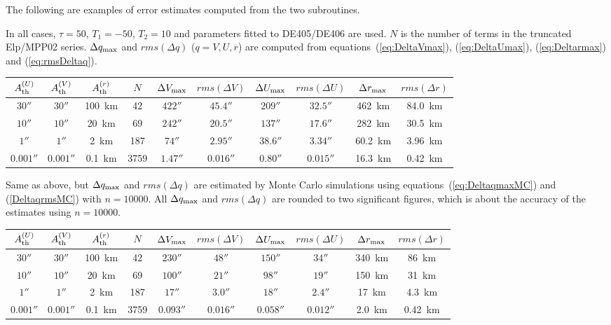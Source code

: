 \documentclass[12pt]{article}
\begin{document}
The following are examples of error estimates computed from the two subroutines.

\vskip 0.5cm
In all cases, $\tau=50$, $T_1=-50$, $T_2=10$ and parameters fitted to DE405/DE406 are 
used. $N$ is the 
number of terms in the truncated Elp/MPP02 series. $\Delta q_{\rm max}$ 
and $rms(\Delta q)$ ($q=V,U,r$) are computed from equations~(\ref{eq:DeltaVmax}), 
(\ref{eq:DeltaUmax}), (\ref{eq:Deltarmax}) and (\ref{eq:rmsDeltaq}). 

\begin{tabular}{cccccccccc}
\hline
  $A_{\rm th}^{(U)}$ & $A_{\rm th}^{(V)}$ & $A_{\rm th}^{(r)}$ & $N$ &
  $\Delta V_{\rm max}$ & $rms(\Delta V)$ & $\Delta U_{\rm max}$ & $rms(\Delta U)$
  & $\Delta r_{\rm max}$ & $rms(\Delta r)$ \\
\hline
  $30''$ & $30''$ & 100~km & 42 & $422''$ & $45.4''$ & $209''$ & $32.5''$ & 462~km &
84.0~km \\
  $10''$ & $10''$ & 20~km & 69 & $242''$ & $20.5''$ & $137''$ & $17.6''$ & 282~km &
30.5~km \\
  $1''$ & $1''$ & 2~km & 187 & $74''$ & $2.95''$ & $38.6''$ & $3.34''$ & 60.2~km &
3.96~km \\
  $0.001''$ & $0.001''$ & 0.1~km & 3759 & $1.47''$ & $0.016''$ & $0.80''$ & $0.015''$ &
  16.3~km & 0.42~km \\
\hline
\end{tabular}

\vskip 0.5cm
Same as above, but $\Delta q_{\rm max}$
and $rms(\Delta q)$ are estimated by Monte Carlo simulations using 
equations~(\ref{eq:DeltaqmaxMC}) 
and (\ref{DeltaqrmsMC}) with $n=10000$. All $\Delta q_{\rm max}$ and 
$rms(\Delta q)$ are rounded to two significant figures, which is about the 
accuracy of the estimates using $n=10000$.

\begin{tabular}{cccccccccc}
\hline
  $A_{\rm th}^{(U)}$ & $A_{\rm th}^{(V)}$ & $A_{\rm th}^{(r)}$ & $N$ &
  $\Delta V_{\rm max}$ & $rms(\Delta V)$ & $\Delta U_{\rm max}$ & $rms(\Delta U)$ 
  & $\Delta r_{\rm max}$ & $rms(\Delta r)$ \\
\hline
  $30''$ & $30''$ & 100~km & 42 & $230''$ & $48''$ & $150''$ & $34''$ & 340~km & 
86~km \\
  $10''$ & $10''$ & 20~km & 69 & $100''$ & $21''$ & $98''$ & $19''$ & 150~km & 
31~km \\
  $1''$ & $1''$ & 2~km & 187 & $17''$ & $3.0''$ & $18''$ & $2.4''$ & 17~km & 
4.3~km \\ 
  $0.001''$ & $0.001''$ & 0.1~km & 3759 & $0.093''$ & $0.016''$ & $0.058''$ & $0.012''$ & 
  2.0~km & 0.42~km \\
\hline
\end{tabular}
\end{document}

